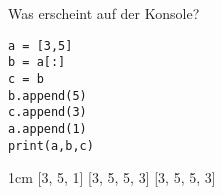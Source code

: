 \question[3]
Was erscheint auf der Konsole?
\begin{lstlisting}
a = [3,5]
b = a[:]
c = b
b.append(5)
c.append(3)
a.append(1)
print(a,b,c)
\end{lstlisting}
\begin{solutionbox}{1cm}
[3, 5, 1] [3, 5, 5, 3] [3, 5, 5, 3]
\end{solutionbox}

